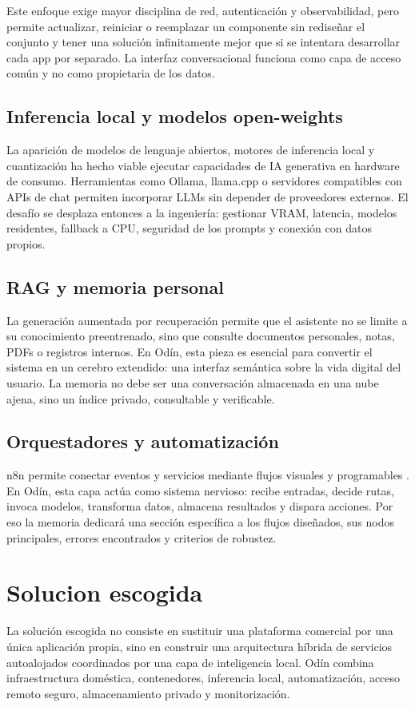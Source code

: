Este enfoque exige mayor disciplina de red, autenticación y observabilidad, pero permite actualizar, reiniciar o reemplazar un componente sin rediseñar el conjunto y tener una solución infinitamente mejor que si se intentara desarrollar cada app por separado. La interfaz conversacional funciona como capa de acceso común y no como propietaria de los datos.

\subsection{Inferencia local y modelos open-weights}
La aparición de modelos de lenguaje abiertos, motores de inferencia local y cuantización ha hecho viable ejecutar capacidades de IA generativa en hardware de consumo. Herramientas como Ollama, llama.cpp o servidores compatibles con APIs de chat permiten incorporar LLMs sin depender de proveedores externos. El desafío se desplaza entonces a la ingeniería: gestionar VRAM, latencia, modelos residentes, fallback a CPU, seguridad de los prompts y conexión con datos propios.

\subsection{RAG y memoria personal}
La generación aumentada por recuperación permite que el asistente no se limite a su conocimiento preentrenado, sino que consulte documentos personales, notas, PDFs o registros internos. En Odín, esta pieza es esencial para convertir el sistema en un cerebro extendido: una interfaz semántica sobre la vida digital del usuario. La memoria no debe ser una conversación almacenada en una nube ajena, sino un índice privado, consultable y verificable.

\subsection{Orquestadores y automatización}
n8n permite conectar eventos y servicios mediante flujos visuales y programables \cite{n8nDocs}. En Odín, esta capa actúa como sistema nervioso: recibe entradas, decide rutas, invoca modelos, transforma datos, almacena resultados y dispara acciones. Por eso la memoria dedicará una sección específica a los flujos diseñados, sus nodos principales, errores encontrados y criterios de robustez.

\section{Solucion escogida}
La solución escogida no consiste en sustituir una plataforma comercial por una única aplicación propia, sino en construir una arquitectura híbrida de servicios autoalojados coordinados por una capa de inteligencia local. Odín combina infraestructura doméstica, contenedores, inferencia local, automatización, acceso remoto seguro, almacenamiento privado y monitorización.


